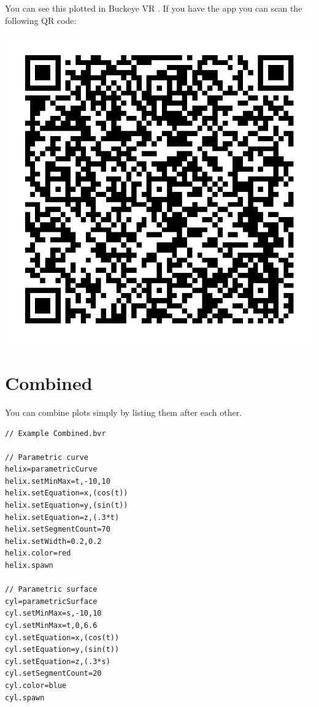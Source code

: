 \documentclass{ximera}
\begin{document}
You can see this plotted in Buckeye VR
.
If you have the app you can scan the following QR code:
\begin{image}
\includegraphics{bvrQR2.png}  
\end{image}

\section{Combined}

You can combine plots simply by listing them after each other.

\begin{verbatim}
// Example Combined.bvr

// Parametric curve
helix=parametricCurve
helix.setMinMax=t,-10,10
helix.setEquation=x,(cos(t))
helix.setEquation=y,(sin(t))
helix.setEquation=z,(.3*t)
helix.setSegmentCount=70
helix.setWidth=0.2,0.2
helix.color=red
helix.spawn

// Parametric surface
cyl=parametricSurface
cyl.setMinMax=s,-10,10
cyl.setMinMax=t,0,6.6
cyl.setEquation=x,(cos(t))
cyl.setEquation=y,(sin(t))
cyl.setEquation=z,(.3*s)
cyl.setSegmentCount=20
cyl.color=blue
cyl.spawn
\end{verbatim}
\end{document}
